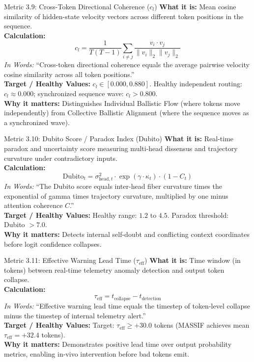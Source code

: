 \documentclass[11pt,a4paper]{article}
\begin{document}
\begin{metricbox}{Metric 3.9: Cross-Token Directional Coherence ($c_l$)}
\textbf{What it is:} Mean cosine similarity of hidden-state velocity vectors across different token positions in the sequence.\\
\textbf{Calculation:}
 $$c_l = \frac{1}{T(T-1)} \sum_{i \neq j} \frac{v_i \cdot v_j}{\|v_i\|_2 \|v_j\|_2}$$ \emph{In Words:} ``Cross-token directional coherence equals the average pairwise velocity cosine similarity across all token positions.''\\
\textbf{Target / Healthy Values:} $c_l \in [0.000, 0.880]$. Healthy independent routing: $c_l \approx 0.000$; synchronized sequence wave: $c_l > 0.800$.\\
\textbf{Why it matters:} Distinguishes Individual Ballistic Flow (where tokens move independently) from Collective Ballistic Alignment (where the sequence moves as a synchronized wave).
\end{metricbox}

\begin{metricbox}{Metric 3.10: Dubito Score / Paradox Index (Dubito)}
\textbf{What it is:} Real-time paradox and uncertainty score measuring multi-head dissensus and trajectory curvature under contradictory inputs.\\
\textbf{Calculation:}
 $$\text{Dubito}_t = \sigma_{\text{head}, t}^2 \cdot \exp\left(\gamma \cdot \kappa_t\right) \cdot \left(1 - C_t\right)$$ \emph{In Words:} ``The Dubito score equals inter-head fiber curvature times the exponential of gamma times trajectory curvature, multiplied by one minus attention coherence $C$.''\\
\textbf{Target / Healthy Values:} Healthy range: $1.2$ to $4.5$. Paradox threshold: Dubito $> 7.0$.\\
\textbf{Why it matters:} Detects internal self-doubt and conflicting context coordinates before logit confidence collapses.
\end{metricbox}

\begin{metricbox}{Metric 3.11: Effective Warning Lead Time ($\tau_{\text{eff}}$)}
\textbf{What it is:} Time window (in tokens) between real-time telemetry anomaly detection and output token collapse.\\
\textbf{Calculation:}
 $$\tau_{\text{eff}} = t_{\text{collapse}} - t_{\text{detection}}$$ \emph{In Words:} ``Effective warning lead time equals the timestep of token-level collapse minus the timestep of internal telemetry alert.''\\
\textbf{Target / Healthy Values:} Target: $\tau_{\text{eff}} \ge +30.0$ tokens (MASSIF achieves mean $\tau_{\text{eff}} = +32.4$ tokens).\\
\textbf{Why it matters:} Demonstrates positive lead time over output probability metrics, enabling in-vivo intervention before bad tokens emit.
\end{metricbox}
\end{document}
